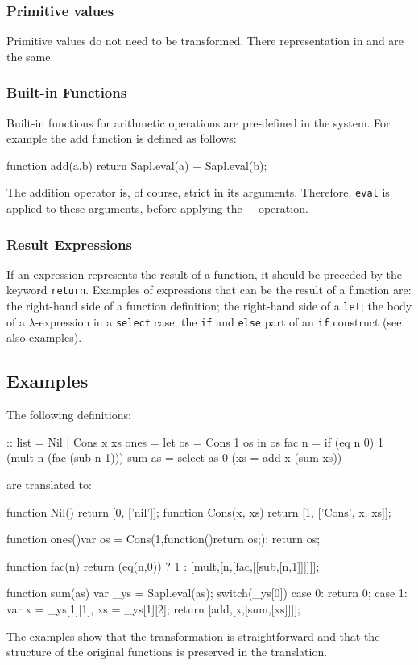 \subsubsection{Primitive values}
Primitive values do not need to be transformed. There representation in \Sapl and \JS are the same.

\subsubsection{Built-in Functions}
Built-in functions for arithmetic operations are pre-defined in the system.
For example the \textsf{add} function  is defined as follows:
\begin{CleanCode}
function add(a,b) {return Sapl.eval(a) + Sapl.eval(b);}
\end{CleanCode}
The addition operator is, of course, strict in its arguments. 
Therefore, \texttt{eval} is applied to these arguments, before applying the + operation.

\subsubsection{Result Expressions}
If an expression represents the result of a function, it should be preceded by the \JS keyword \texttt{return}.
Examples of expressions that can be the result of a function are: the right-hand side of a function definition; 
the right-hand side of a \texttt{let}; 
the body of a $\lambda$-expression in a \texttt{select} case; 
the \texttt{if} and \texttt{else} part of an \texttt{if} construct (see also examples).

\subsection{Examples}
The following \Sapl definitions:
\begin{CleanCode}
:: list = Nil | Cons x xs	
ones = let os = Cons 1 os in os
fac n = if (eq n 0) 1 (mult n (fac (sub n 1)))
sum as = select as 0 (\x xs = add x (sum xs))
\end{CleanCode}
%
are translated to:
\begin{CleanCode}
function Nil() {return [0, ['nil']];}
function Cons(x, xs) {return [1, ['Cons', x, xs]];}

function ones(){var os = Cons(1,function(){return os;}); return os;}

function fac(n){
    return (eq(n,0)) ? 1 : [mult,[n,[fac,[[sub,[n,1]]]]]];
}

function sum(as){
	var _ys = Sapl.eval(as);
	switch(_ys[0]){
		case 0: return 0;
		case 1: var x = _ys[1][1], xs = _ys[1][2]; 
				return [add,[x,[sum,[xs]]]];
	}
}

\end{CleanCode}
The examples show that the transformation is straightforward and 
that the structure of the original functions is preserved in the translation.

